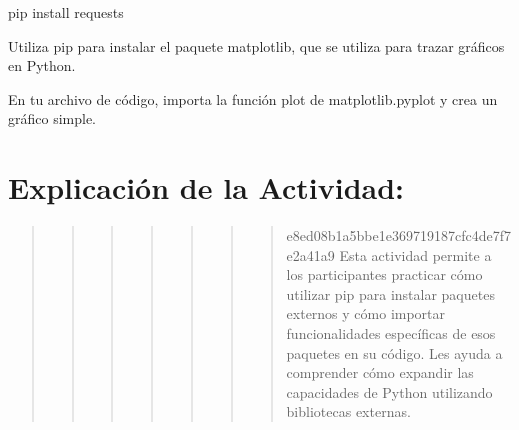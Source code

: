\documentclass[
  a4paper,
  DIV=11,
  numbers=noendperiod,
  onepage,
  openany]{scrreprt}
\newenvironment{Shaded}{\begin{snugshade}}{\end{snugshade}}
\newcommand{\ExtensionTok}[1]{\textcolor[rgb]{0.00,0.23,0.31}{#1}}
\newcommand{\NormalTok}[1]{\textcolor[rgb]{0.00,0.23,0.31}{#1}}
\begin{document}
\begin{Shaded}
\begin{Highlighting}[]
\ExtensionTok{pip}\NormalTok{ install requests}
\end{Highlighting}
\end{Shaded}

\begin{tcolorbox}[enhanced jigsaw, colbacktitle=quarto-callout-important-color!10!white, toprule=.15mm, leftrule=.75mm, titlerule=0mm, opacityback=0, rightrule=.15mm, opacitybacktitle=0.6, breakable, left=2mm, coltitle=black, title=\textcolor{quarto-callout-important-color}{\faExclamation}\hspace{0.5em}{Actividad Práctica:}, toptitle=1mm, bottomtitle=1mm, arc=.35mm, bottomrule=.15mm, colback=white, colframe=quarto-callout-important-color-frame]

Utiliza pip para instalar el paquete matplotlib, que se utiliza para
trazar gráficos en Python.

En tu archivo de código, importa la función plot de matplotlib.pyplot y
crea un gráfico simple.

\end{tcolorbox}

\hypertarget{explicaciuxf3n-de-la-actividad-63}{%
\section{Explicación de la
Actividad:}\label{explicaciuxf3n-de-la-actividad-63}}

\begin{quote}
\begin{quote}
\begin{quote}
\begin{quote}
\begin{quote}
\begin{quote}
\begin{quote}
e8ed08b1a5bbe1e369719187cfc4de7f7e2a41a9 Esta actividad permite a los
participantes practicar cómo utilizar pip para instalar paquetes
externos y cómo importar funcionalidades específicas de esos paquetes en
su código. Les ayuda a comprender cómo expandir las capacidades de
Python utilizando bibliotecas externas.
\end{quote}
\end{quote}
\end{quote}
\end{quote}
\end{quote}
\end{quote}
\end{quote}
\end{document}
